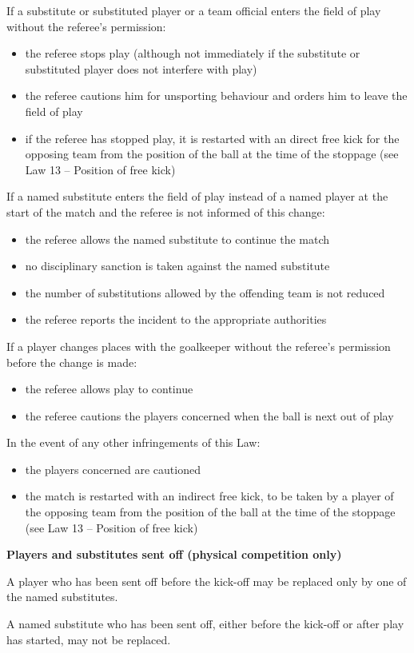 If a substitute or substituted player or a team official enters the field of play
without the referee's permission:

\begin{itemize}
\item the referee stops play (although not immediately if the substitute or substituted player does not interfere with play)
\item the referee cautions him for unsporting behaviour and orders him to leave the field of play
\item if the referee has stopped play, it is restarted with an direct free kick
      for the opposing team from the position of the ball at the time of the
      stoppage (see Law 13 -- Position of free kick)
\end{itemize}

\bigskip

If a named substitute enters the field of play instead of a named player at the start of the match and the referee is not informed of this change:

\begin{itemize}
\item the referee allows the named substitute to continue the match
\item no disciplinary sanction is taken against the named substitute
\item the number of substitutions allowed by the offending team is not reduced
\item the referee reports the incident to the appropriate authorities
\end{itemize}

\bigskip

If a player changes places with the goalkeeper without the
referee's permission before the change is made:

\begin{itemize}
\item the referee allows play to continue
\item the referee cautions the players concerned when the ball is next out of play
\end{itemize}

\bigskip

In the event of any other infringements of this Law:

\begin{itemize}
\item the players concerned are cautioned
\item the match is restarted with an indirect free kick, to be taken by a player of the opposing team from the position of the ball at the time of the stoppage (see Law 13 -- Position of free kick)
\end{itemize}

\bigskip

{\bfseries Players and substitutes sent off (physical competition only)}

\headlinebox

A player who has been sent off before the kick-off may be replaced only by one of the named substitutes.

\bigskip

A named substitute who has been sent off, either before the kick-off or after play has started, may not be replaced.

